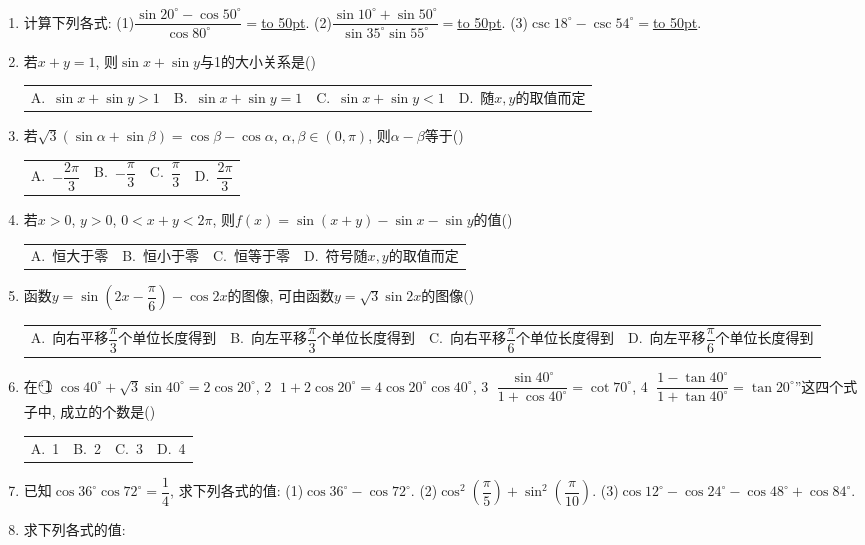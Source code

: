 \documentclass[10pt,a4paper]{article}
\newcommand{\blank}[1]{\underline{\hbox to #1pt{}}}
\newcommand{\fourch}[4]{\par\begin{tabular}{p{.23\textwidth}p{.23\textwidth}p{.23\textwidth}p{.23\textwidth}}
A.~#1 &B.~#2& C.~#3& D.~#4
\end{tabular}}
\begin{document}
\begin{enumerate}[1.]
(1)$\sin 10^\circ +\sin 50^\circ -\sin 70^\circ =$\blank{50}.
(2)$\cos 20^\circ -\cos 80^\circ -\sin 50^\circ =$\blank{50}.
(3)$\sin 15^\circ -\sin 75^\circ +2\sin 15^\circ \sin 75^\circ =$\blank{50}.
(4)$\sin 80^\circ -\sin 20^\circ +2\sin 10^\circ \cos 50^\circ =$\blank{50}.
(5)$\cos \dfrac{5\pi}{13}+\cos \dfrac{3\pi}{13}+2\cos \dfrac{9\pi}{13}\cos \dfrac{\pi}{13}=$\blank{50}.
(6)$\cos ^2(\alpha +\beta)+\cos ^2(\alpha -\beta)-\cos 2\alpha \cos 2\beta =$\blank{50}.
(7)$\cos \alpha +\cos (\dfrac 23\pi +\alpha)+\cos (\dfrac 23\pi -\alpha)=$\blank{50}.
(8)$\sin ^240^\circ +\sin ^280^\circ +\dfrac 12\cos 220^\circ =$\blank{50}.
(9)$\cos 20^\circ +\sin 60^\circ +\cos 100^\circ +\cos 140^\circ =$\blank{50}.
(10)$\sin 63^\circ -\sin 27^\circ +2\sqrt 2\cos 84^\circ \sin 66^\circ =$\blank{50}.
\item 计算下列各式:
(1)$\dfrac{\sin 20^\circ -\cos 50^\circ}{\cos 80^\circ}=$\blank{50}.
(2)$\dfrac{\sin 10^\circ +\sin 50^\circ}{\sin 35^\circ \sin 55^\circ}=$\blank{50}.
(3)$\csc 18^\circ -\csc 54^\circ =$\blank{50}.
\item 若$x+y=1$, 则$\sin x+\sin y$与1的大小关系是()
\fourch{$\sin x+\sin y>1$}{$\sin x+\sin y=1$}{$\sin x+\sin y<1$}{随$x,y$的取值而定}
\item 若$\sqrt 3(\sin \alpha +\sin \beta)=\cos \beta -\cos \alpha$, $\alpha ,\beta \in (0,\pi)$, 则$\alpha -\beta$等于()
\fourch{$-\dfrac{2\pi}3$}{$-\dfrac{\pi}3$}{$\dfrac{\pi}3$}{$\dfrac{2\pi}3$}
\item 若$x>0$, $y>0$, $0<x+y<2\pi$, 则$f(x)=\sin (x+y)-\sin x-\sin y$的值()
\fourch{恒大于零}{恒小于零}{恒等于零}{符号随$x,y$的取值而定}
\item 函数$y=\sin (2x-\dfrac{\pi}6)-\cos 2x$的图像, 可由函数$y=\sqrt 3\sin 2x$的图像()
\fourch{向右平移$\dfrac{\pi}3$个单位长度得到}{向左平移$\dfrac{\pi}3$个单位长度得到}{向右平移$\dfrac{\pi}6$个单位长度得到}{向左平移$\dfrac{\pi}6$个单位长度得到}
\item 在``\textcircled{1} $\cos 40^\circ +\sqrt 3\sin 40^\circ =2\cos 20^\circ$, \textcircled{2} $1+2\cos 20^\circ =4\cos 20^\circ \cos 40^\circ$, \textcircled{3} $\dfrac{\sin 40^\circ}{1+\cos 40^\circ}=\cot 70^\circ$, \textcircled{4} $\dfrac{1-\tan 40^\circ}{1+\tan 40^\circ}=\tan 20^\circ$''这四个式子中, 成立的个数是()
\fourch{1}{2}{3}{4}
\item 已知$\cos 36^\circ \cos 72^\circ =\dfrac 14$, 求下列各式的值:
(1)$\cos 36^\circ -\cos 72^\circ$.				(2)$\cos ^2(\dfrac\pi 5)+\sin ^2(\dfrac \pi {10})$.
(3)$\cos 12^\circ -\cos 24^\circ -\cos 48^\circ +\cos 84^\circ$.
\item 求下列各式的值:

\end{enumerate}
\end{document}
